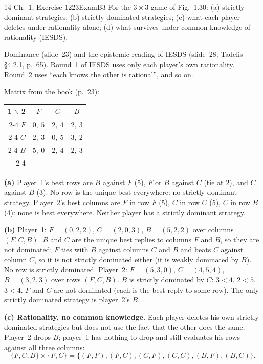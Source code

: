 \begin{exsol}{14}{\MG{} Ch.~1, Exercise 12}{23}{Exam}{B3}
\asked For the $3 \times 3$ game of Fig.~1.30: (a) strictly dominant strategies; (b) strictly
dominated strategies; (c) what each player deletes under rationality alone; (d) what survives
under common knowledge of rationality (IESDS).

\method Dominance (slide~23) and the epistemic reading of IESDS (slide~28; Tadelis \S4.2.1,
p.~65). Round~1 of IESDS uses only each player's own rationality. Round~2 uses ``each knows the
other is rational'', and so on.

\solution
Matrix from the book (p.~23):
\begin{center}
\begin{tabular}{r|c|c|c|}
\multicolumn{1}{r}{1 $\backslash$ 2} & \multicolumn{1}{c}{$F$} & \multicolumn{1}{c}{$C$} & \multicolumn{1}{c}{$B$}\\ \cline{2-4}
$F$ & $0,\ 5$ & $2,\ 4$ & $2,\ 3$ \\ \cline{2-4}
$C$ & $2,\ 3$ & $0,\ 5$ & $3,\ 2$ \\ \cline{2-4}
$B$ & $5,\ 0$ & $2,\ 4$ & $2,\ 3$ \\ \cline{2-4}
\end{tabular}
\end{center}

\textbf{(a)} Player~1's best rows are $B$ against $F$ (5), $F$ or $B$ against $C$ (tie at 2),
and $C$ against $B$ (3). No row is the unique best everywhere: no strictly dominant strategy.
Player~2's best columns are $F$ in row $F$ (5), $C$ in row $C$ (5), $C$ in row $B$ (4): none is
best everywhere. Neither player has a strictly dominant strategy.

\textbf{(b)} Player~1: $F = (0, 2, 2)$, $C = (2, 0, 3)$, $B = (5, 2, 2)$ over columns
$(F, C, B)$. $B$ and $C$ are the unique best replies to columns $F$ and $B$, so they are not
dominated; $F$ ties with $B$ against columns $C$ and $B$ and beats $C$ against column $C$, so it
is not strictly dominated either (it is weakly dominated by $B$). No row is strictly dominated. Player~2:
$F = (5, 3, 0)$, $C = (4, 5, 4)$, $B = (3, 2, 3)$ over rows $(F, C, B)$. $B$ is strictly dominated
by $C$: $3 < 4$, $2 < 5$, $3 < 4$. $F$ and $C$ are not dominated (each is the best reply to some
row). The only strictly dominated strategy is player~2's $B$.

\textbf{(c) Rationality, no common knowledge.} Each player deletes his own strictly dominated
strategies but does not use the fact that the other does the same. Player~2 drops $B$;
player~1 has nothing to drop and still evaluates his rows against all three columns:
\[
  \{F, C, B\} \times \{F, C\} = \{(F,F), (F,C), (C,F), (C,C), (B,F), (B,C)\}.
\]


\end{exsol}
